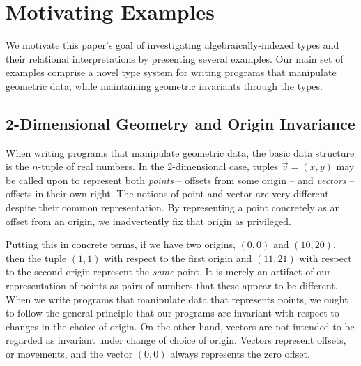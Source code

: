 \section{Motivating Examples}

We motivate this paper's goal of investigating algebraically-indexed
types and their relational interpretations by presenting several
examples. Our main set of examples comprise a novel type system for
writing programs that manipulate geometric data, while maintaining
geometric invariants through the types. 

\subsection{2-Dimensional Geometry and Origin Invariance}

When writing programs that manipulate geometric data, the basic data
structure is the $n$-tuple of real numbers. In the 2-dimensional case,
tuples $\vec{v} = (x,y)$ may be called upon to represent both
\emph{points} -- offsets from some origin -- and \emph{vectors} --
offsets in their own right. The notions of point and vector are very
different despite their common representation. By representing a point
concretely as an offset from an origin, we inadvertently fix that
origin as privileged.

Putting this in concrete terms, if we have two origins, $(0,0)$ and
$(10,20)$, then the tuple $(1,1)$ with respect to the first origin and
$(11,21)$ with respect to the second origin represent the \emph{same}
point. It is merely an artifact of our representation of points as
pairs of numbers that these appear to be different. When we write
programs that manipulate data that represents points, we ought to
follow the general principle that our programs are invariant with
respect to changes in the choice of origin. On the other hand, vectors
are not intended to be regarded as invariant under change of choice of
origin. Vectors represent offsets, or movements, and the vector
$(0,0)$ always represents the zero offset.

